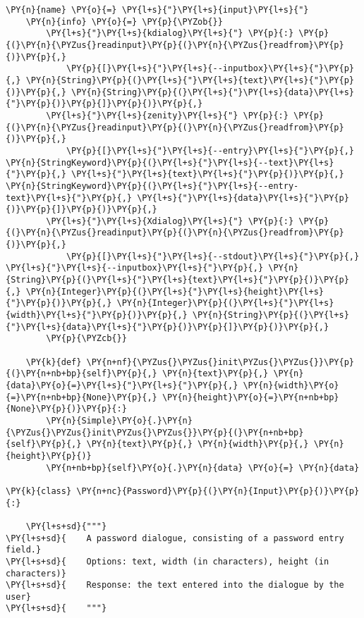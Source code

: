 \begin{Verbatim}[commandchars=\\\{\}]
    \PY{n}{name} \PY{o}{=} \PY{l+s}{"}\PY{l+s}{input}\PY{l+s}{"}
    \PY{n}{info} \PY{o}{=} \PY{p}{\PYZob{}}
        \PY{l+s}{"}\PY{l+s}{kdialog}\PY{l+s}{"} \PY{p}{:} \PY{p}{(}\PY{n}{\PYZus{}readinput}\PY{p}{(}\PY{n}{\PYZus{}readfrom}\PY{p}{)}\PY{p}{,}
            \PY{p}{[}\PY{l+s}{"}\PY{l+s}{--inputbox}\PY{l+s}{"}\PY{p}{,} \PY{n}{String}\PY{p}{(}\PY{l+s}{"}\PY{l+s}{text}\PY{l+s}{"}\PY{p}{)}\PY{p}{,} \PY{n}{String}\PY{p}{(}\PY{l+s}{"}\PY{l+s}{data}\PY{l+s}{"}\PY{p}{)}\PY{p}{]}\PY{p}{)}\PY{p}{,}
        \PY{l+s}{"}\PY{l+s}{zenity}\PY{l+s}{"} \PY{p}{:} \PY{p}{(}\PY{n}{\PYZus{}readinput}\PY{p}{(}\PY{n}{\PYZus{}readfrom}\PY{p}{)}\PY{p}{,}
            \PY{p}{[}\PY{l+s}{"}\PY{l+s}{--entry}\PY{l+s}{"}\PY{p}{,} \PY{n}{StringKeyword}\PY{p}{(}\PY{l+s}{"}\PY{l+s}{--text}\PY{l+s}{"}\PY{p}{,} \PY{l+s}{"}\PY{l+s}{text}\PY{l+s}{"}\PY{p}{)}\PY{p}{,} \PY{n}{StringKeyword}\PY{p}{(}\PY{l+s}{"}\PY{l+s}{--entry-text}\PY{l+s}{"}\PY{p}{,} \PY{l+s}{"}\PY{l+s}{data}\PY{l+s}{"}\PY{p}{)}\PY{p}{]}\PY{p}{)}\PY{p}{,}
        \PY{l+s}{"}\PY{l+s}{Xdialog}\PY{l+s}{"} \PY{p}{:} \PY{p}{(}\PY{n}{\PYZus{}readinput}\PY{p}{(}\PY{n}{\PYZus{}readfrom}\PY{p}{)}\PY{p}{,}
            \PY{p}{[}\PY{l+s}{"}\PY{l+s}{--stdout}\PY{l+s}{"}\PY{p}{,} \PY{l+s}{"}\PY{l+s}{--inputbox}\PY{l+s}{"}\PY{p}{,} \PY{n}{String}\PY{p}{(}\PY{l+s}{"}\PY{l+s}{text}\PY{l+s}{"}\PY{p}{)}\PY{p}{,} \PY{n}{Integer}\PY{p}{(}\PY{l+s}{"}\PY{l+s}{height}\PY{l+s}{"}\PY{p}{)}\PY{p}{,} \PY{n}{Integer}\PY{p}{(}\PY{l+s}{"}\PY{l+s}{width}\PY{l+s}{"}\PY{p}{)}\PY{p}{,} \PY{n}{String}\PY{p}{(}\PY{l+s}{"}\PY{l+s}{data}\PY{l+s}{"}\PY{p}{)}\PY{p}{]}\PY{p}{)}\PY{p}{,}
        \PY{p}{\PYZcb{}}

    \PY{k}{def} \PY{n+nf}{\PYZus{}\PYZus{}init\PYZus{}\PYZus{}}\PY{p}{(}\PY{n+nb+bp}{self}\PY{p}{,} \PY{n}{text}\PY{p}{,} \PY{n}{data}\PY{o}{=}\PY{l+s}{"}\PY{l+s}{"}\PY{p}{,} \PY{n}{width}\PY{o}{=}\PY{n+nb+bp}{None}\PY{p}{,} \PY{n}{height}\PY{o}{=}\PY{n+nb+bp}{None}\PY{p}{)}\PY{p}{:}
        \PY{n}{Simple}\PY{o}{.}\PY{n}{\PYZus{}\PYZus{}init\PYZus{}\PYZus{}}\PY{p}{(}\PY{n+nb+bp}{self}\PY{p}{,} \PY{n}{text}\PY{p}{,} \PY{n}{width}\PY{p}{,} \PY{n}{height}\PY{p}{)}
        \PY{n+nb+bp}{self}\PY{o}{.}\PY{n}{data} \PY{o}{=} \PY{n}{data}

\PY{k}{class} \PY{n+nc}{Password}\PY{p}{(}\PY{n}{Input}\PY{p}{)}\PY{p}{:}

    \PY{l+s+sd}{"""}
\PY{l+s+sd}{    A password dialogue, consisting of a password entry field.}
\PY{l+s+sd}{    Options: text, width (in characters), height (in characters)}
\PY{l+s+sd}{    Response: the text entered into the dialogue by the user}
\PY{l+s+sd}{    """}


\end{Verbatim}
